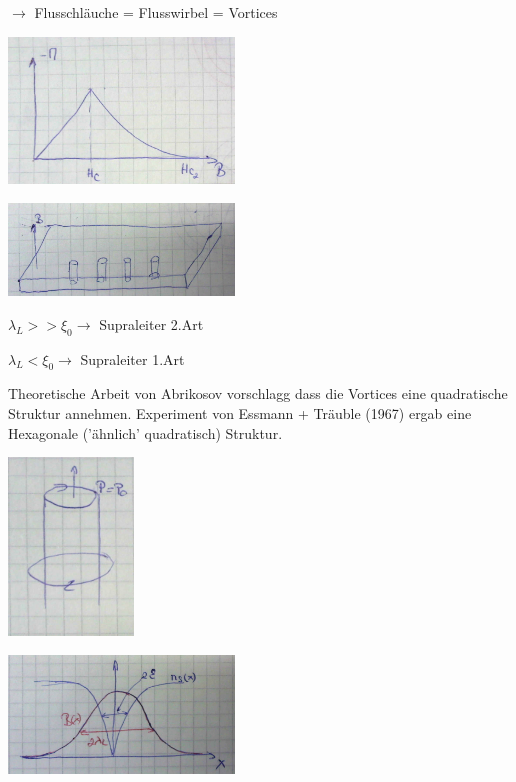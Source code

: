 \(\rightarrow \) Flusschläuche = Flusswirbel = Vortices



\includegraphics[width=0.45\textwidth]{kap13_18.png}


\includegraphics[width=0.45\textwidth]{kap13_19.png}


\(\lambda_L >> \xi_0  \rightarrow \) Supraleiter 2.Art

 \(\lambda_L < \xi_0  \rightarrow \) Supraleiter 1.Art


Theoretische Arbeit von Abrikosov vorschlagg dass die Vortices eine quadratische Struktur annehmen. Experiment von Essmann + Träuble (1967) ergab eine Hexagonale ('ähnlich' quadratisch) Struktur.

\includegraphics[width=0.25\textwidth]{kap13_20.png}

\includegraphics[width=0.45\textwidth]{kap13_21.png}
